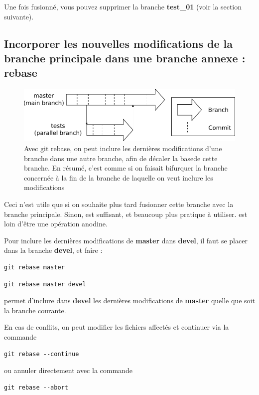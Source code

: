 \documentclass[a4paper,twoside]{article}
\begin{document}
Une fois fusionné, vous pouvez supprimer la branche \textbf{test\_01} (voir la section suivante).

\subsection{Incorporer les nouvelles modifications de la branche principale dans une branche annexe : rebase}
\begin{figure}[htb]
\centering
\includegraphics[width=0.75\linewidth]{figure/branchs.pdf}
\caption{Avec git rebase, on peut inclure les dernières modifications d'une branche dans une autre branche, afin de décaler la \og base\fg de cette branche. En résumé, c'est comme si on faisait bifurquer la branche concernée à la fin de la branche de laquelle on veut inclure les modifications}
\end{figure}

\begin{attention}
Ceci n'est utile que si on souhaite plus tard fusionner cette branche avec la branche principale. Sinon,  est suffisant, et beaucoup plus pratique à utiliser.  est loin d'être une opération anodine.
\end{attention}

Pour inclure les dernières modifications de \textbf{master} dans \textbf{devel}, il faut se placer dans la branche \textbf{devel}, et faire :
\begin{verbatim}
git rebase master
\end{verbatim}


\begin{verbatim}
git rebase master devel
\end{verbatim}
permet d'inclure dans \textbf{devel} les dernières modifications de \textbf{master} quelle que soit la branche courante.
\bigskip

En cas de conflits, on peut modifier les fichiers affectés et continuer via la commande 
\begin{verbatim}
git rebase --continue
\end{verbatim}
ou annuler directement avec la commande
\begin{verbatim}
git rebase --abort
\end{verbatim}
\end{document}
